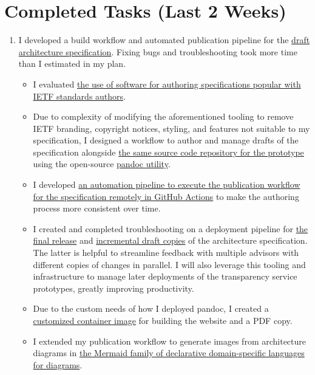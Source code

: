 \documentclass{jdf}
\begin{document}
\section*{Completed Tasks (Last 2 Weeks)}

\begin{enumerate}
    \item I developed a build workflow and automated publication pipeline for the \hyperlink{https://add-architecture-draft--conmotion.netlify.app/architecture.html}{draft architecture specification}. Fixing bugs and troubleshooting took more time than I estimated in my plan.
        \begin{itemize}
            \item I evaluated \hyperlink{https://github.com/martinthomson/i-d-template}{the use of software for authoring specifications popular with IETF standards authors}.
            \item Due to complexity of modifying the aforementioned tooling to remove IETF branding, copyright notices, styling, and features not suitable to my specification, I designed a workflow to author and manage drafts of the specification alongside \hyperlink{https://github.com/aj-stein/conmotion/}{the same source code repository for the prototype} using the open-source \hyperlink{https://pandoc.org/}{pandoc utility}.
            \item I developed \hyperlink{https://github.com/aj-stein/conmotion/blob/develop/.github/workflows/cd.yml}{an automation pipeline to execute the publication workflow for the specification remotely in GitHub Actions} to make the authoring process more consistent over time.
            \item I created and completed troubleshooting on a deployment pipeline for \hyperlink{https://aj-stein.github.io/conmotion/}{the final release} and \hyperlink{https://conmotion.netlify.app/}{incremental draft copies} of the architecture specification. The latter is helpful to streamline feedback with multiple advisors with different copies of changes in parallel. I will also leverage this tooling and infrastructure to manage later deployments of the transparency service prototypes, greatly improving productivity. 
            \item Due to the custom needs of how I deployed pandoc, I created a \hyperlink{https://github.com/users/aj-stein/packages/container/package/pandoc\%2Flatex}{customized container image} for building the website and a PDF copy.
            \item I extended my publication workflow to generate images from architecture diagrams in \hyperlink{https://mermaid.js.org/}{the Mermaid family of declarative domain-specific languages for diagrams}.

\end{itemize}
\end{enumerate}
\end{document}
